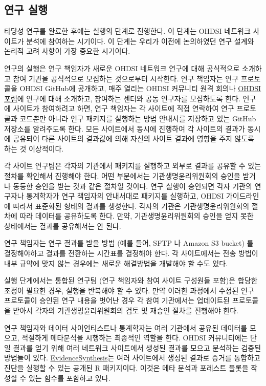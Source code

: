\documentclass[11pt]{book}
\theoremstyle{definition}
\theoremstyle{definition}
\theoremstyle{definition}
\theoremstyle{remark}
\begin{document}
\subsection{연구 실행}\label{--1}

타당성 연구를 완료한 후에는 실행의 단계로 진행한다. 이 단계는 OHDSI
네트워크 사이트가 분석에 참여하는 시기이다. 이 단계는 우리가 이전에
논의하였던 연구 설계와 논리적 고려 사항이 가장 중요한 시기이다.

연구의 실행은 연구 책임자가 새로운 OHDSI 네트워크 연구에 대해 공식적으로
소개하고 참여 기관을 공식적으로 모집하는 것으로부터 시작한다. 연구
책임자는 연구 프로토콜을 OHDSI GitHub에 공개하고, 매주 열리는 OHDSI
커뮤니티 원격 회의나 \href{http://forums.ohdsi.org}{OHDSI 포럼}에 연구에
대해 소개하고, 참여하는 센터와 공동 연구자를 모집하도록 한다. 연구에
사이트가 참여하려고 하면, 연구 책임자는 각 사이트에 직접 연락하여 연구
프로토콜과 코드뿐만 아니라 연구 패키지를 실행하는 방법 안내서를 저장하고
있는 GitHub 저장소를 알려주도록 한다. 모든 사이트에서 동시에 진행하여 각
사이트의 결과가 동시에 공유되어 다른 사이트의 결과값에 의해 자신의
사이트 결과에 영향을 주지 않도록 하는 것 이상적이다.

각 사이트 연구팀은 각자의 기관에서 패키지를 실행하고 외부로 결과를
공유할 수 있는 절차를 확인해서 진행해야 한다. 어떤 부분에서는
기관생명윤리위원회의 승인을 받거나 동등한 승인을 받는 것과 같은 절차일
것이다. 연구 실행이 승인되면 각자 기관의 연구자나 통계학자가 연구
책임자의 안내서대로 패키지를 실행하고, OHDSI 가이드라인에 따라서
표준화된 형태의 결과를 생성한다. 각자의 기관은 기관생명윤리위원회의
절차에 따라 데이터를 공유하도록 한다. 만약, 기관생명윤리위원회의 승인을
얻지 못한 상태에서는 결과를 공유해서는 안 된다.

연구 책임자는 연구 결과를 받을 방법 (예를 들어, SFTP 나 Amazon S3
bucket) 를 결정해야하고 결과를 전환하는 시간표를 결정해야 한다. 각
사이트에서는 전송 방법이 내부 규약에 맞지 않는 경우에는 새로운
해결방법을 개발해야 할 수도 있다.

실행 단계에서는 통합된 연구팀 (연구 책임자와 참여 사이트 구성원들
포함)은 합당한 조정이 필요한 경우, 실행을 반복해야 할 수 있다. 만약
이러한 과정에서 수정된 연구 프로토콜이 승인된 연구 내용을 벗어난 경우 각
참여 기관에서는 업데이트된 프로토콜을 받아서 각자의 기관생명윤리위원회의
검토 및 재승인 절차를 진행해야 한다.

연구 책임자와 데이터 사이언티스트나 통계학자는 여러 기관에서 공유된
데이터를 모으고, 적절하게 메타분석을 시행하는 최종적인 역할을 한다.
OHDSI 커뮤니티에는 단일 결과를 얻기 위해 여러 네트워크 사이트에서 생성된
결과를 모으고 분석하는 검증된 방법들이 있다.
\href{https://github.com/OHDSI/EvidenceSynthesis}{EvidenceSynthesis}는
여러 사이트에서 생성된 결과로 증거를 통합하고 진단을 실행할 수 있는
공개된 R 패키지이다. 이것은 메타 분석과 포레스트 플롯을 작성할 수 있는
함수를 포함하고 있다.
\end{document}
